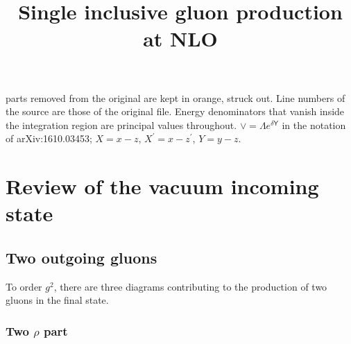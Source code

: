 \documentclass[aps,prd,amsmath,amssymb,nofootinbib]{revtex4-2}
\title{Single inclusive gluon production at NLO}
\numberwithin{equation}{section}
\begin{document}
\tableofcontents \par{} {\color{orange}parts removed from the original are kept in orange, struck out.} {\color{red}Line numbers of the source are those of the original file. Energy denominators that vanish inside the integration region are principal values throughout. $\vee=\Lambda e^{\delta\mathsf{Y}}$ in the notation of arXiv:1610.03453; $X=x-z$, $X^{\prime}=x-z^{\prime}$, $Y=y-z$.}\par

\section{Review of the vacuum incoming state}\label{sec:vac}
\subsection{Two outgoing gluons}
To order $g^2$, there are three  diagrams contributing to the production of two gluons in the final state.

\subsubsection{Two $\rho$ part}
\end{document}
